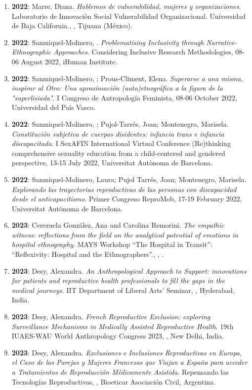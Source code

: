 \begin{enumerate}
\item {\bf 2022}: Marre, Diana. {\it Hablemos de vulnerabilidad, mujeres y organizaciones}. Laboratorio de Innovación Social Vulnerabilidad Organizacional. Universidad de Baja California., , Tijuana (México).\filbreak
\item {\bf 2022}: Sanmiquel-Molinero, . {\it Problematising Inclusivity through Narrative-Ethnographic Approaches}. Considering Inclusive Research Methodologies, 08-06 August 2022, iHuman Institute.\filbreak
\item {\bf 2022}: Sanmiquel-Molinero, ; Prous-Climent, Elena. {\it Superarse a una misma, inspirar al Otro: Una aproximación (auto)etnográfica a la figura de la "superlisiada"}. I Congreso de Antropología Feminista, 08-06 October 2022, Universidad del País Vasco.\filbreak
\item {\bf 2022}: Sanmiquel-Molinero, ; Pujol-Tarrés, Joan; Montenegro, Marisela. {\it Constitución subjetiva de cuerpos disidentes: infancia trans e infancia discapacitada}. I SexAFIN International Virtual Conference (Re)thinking comprehensive sexuality education from a child-centered and gendered perspective, 13-15 July 2022, Universitat Autònoma de Barcelona.\filbreak
\item {\bf 2022}: Sanmiquel-Molinero, Laura; Pujol Tarrés, Joan; Montenegro, Marisela. {\it Explorando las trayectorias reproductivas de las personas con discapacidad desde el anticapacitismo}. Primer Congreso ReproMob, 17-19 February 2022, Universitat Autònoma de Barcelona.\filbreak
\item {\bf 2023}: Cerezuela González, Ana  and Carolina Remorini. {\it The empathic witness: reflections from the field on the analytical potential of emotions in hospital ethnography}. MAYS  Workshop “The Hospital in Transit”: “Reflexivity: Hospital and the Ethnographers”., , .\filbreak
\item {\bf 2023}: Desy, Alexandra. {\it An Anthropological Approach to Support: innovations for patients and reproductive health professionals to fill the gaps in the medical journeys}. IIT Department of Liberal Arts' Seminar, , Hyderabad, India.\filbreak
\item {\bf 2023}: Desy, Alexandra. {\it French Reproductive Exclusion: exploring Surveillance Mechanisms in Medically Assisted Reproductive Health}. 19th IUAES-WAU World Anthropology Congress 2023, , New Delhi, India.\filbreak
\item {\bf 2023}: Desy, Alexandra. {\it Exclusiones e Inclusiones Reproductivas en Europa, el Caso de las Parejas y Mujeres Francesas que Viajan a España para acceder a Tratamientos de Reproducción Médicamente Asistida}. Repensando las Tecnologías Reproductivas, , Bioeticar Asociación Civil, Argentina.\filbreak

\end{enumerate}
